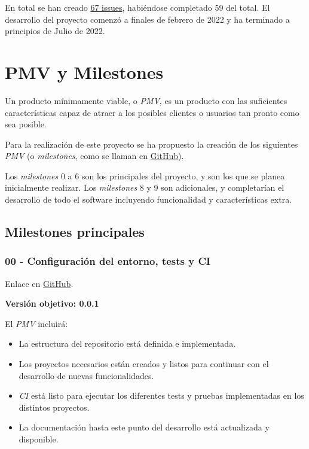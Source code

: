 En total se han creado \href{https://github.com/harvestcore/matroos/issues}{67 issues}, habiéndose completado 59 del total. El desarrollo del proyecto comenzó a finales de febrero de 2022 y ha terminado a principios de Julio de 2022.

\section{PMV y Milestones}

Un producto mínimamente viable, o \textit{PMV}, es un producto con las suficientes características capaz de atraer a los posibles clientes o usuarios tan pronto como sea posible.

Para la realización de este proyecto se ha propuesto la creación de los siguientes \textit{PMV} (o \textit{milestones}, como se llaman en \href{https://github.com/harvestcore/matroos/milestones}{GitHub}).

Los \textit{milestones} 0 a 6 son los principales del proyecto, y son los que se planea inicialmente realizar. Los \textit{milestones} 8 y 9 son adicionales, y completarían el desarrollo de todo el software incluyendo funcionalidad y características extra.

\subsection{Milestones principales}

\subsubsection{00 - Configuración del entorno, tests y CI}

Enlace en \href{https://github.com/harvestcore/matroos/milestone/3}{GitHub}.

\textbf{Versión objetivo: 0.0.1}

El \textit{PMV} incluirá:

\begin{itemize}
	\item La estructura del repositorio está definida e implementada.
	\item Los proyectos necesarios están creados y listos para continuar con el desarrollo de nuevas funcionalidades.
	\item \textit{CI} está listo para ejecutar los diferentes tests y pruebas implementadas en los distintos proyectos.
	\item La documentación hasta este punto del desarrollo está actualizada y disponible.
\end{itemize}

